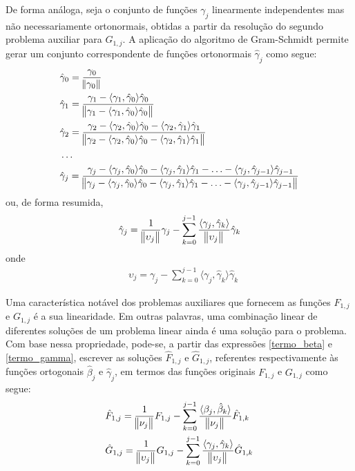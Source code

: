 De forma análoga, seja o conjunto de funções $\gamma_j$ linearmente independentes mas não necessariamente ortonormais, obtidas a partir da resolução do segundo problema auxiliar para $G_{1,j}$. A aplicação do algoritmo de Gram-Schmidt permite gerar um conjunto correspondente de funções ortonormais $\hat{\gamma}_j$ como segue:
\begin{align}
& \hat{\gamma}_0 = \frac{\gamma_0}{\norm{\gamma_0}} \label{gram_schmidt_05} \\
& \hat{\gamma}_1
=
\frac{\gamma_1 - \langle \gamma_1, \hat{\gamma}_0\rangle\hat{\gamma}_0}
{\norm{\gamma_1 - \langle \gamma_1, \hat{\gamma}_0\rangle\hat{\gamma}_0}}\label{gram_schmidt_06} \\
& \hat{\gamma}_2
=
\frac{\gamma_2 - \langle \gamma_2, \hat{\gamma}_0\rangle\hat{\gamma}_0 - \langle \gamma_2, \hat{\gamma}_1\rangle\hat{\gamma}_1}
{\norm{\gamma_2 - \langle \gamma_2, \hat{\gamma}_0\rangle\hat{\gamma}_0 - \langle \gamma_2, \hat{\gamma}_1\rangle\hat{\gamma}_1}} \label{gram_schmidt_07} \\
& \ldots \nonumber \\
& \hat{\gamma}_j
=
\frac{\gamma_j - \langle \gamma_j, \hat{\gamma}_0\rangle\hat{\gamma}_0 - \langle \gamma_j, \hat{\gamma}_1\rangle\hat{\gamma}_1 - \ldots - \langle \gamma_j, \hat{\gamma}_{j - 1}\rangle\hat{\gamma}_{j - 1} }
{\norm{\gamma_j - \langle \gamma_j, \hat{\gamma}_0\rangle\hat{\gamma}_0 - \langle \gamma_j, \hat{\gamma}_1\rangle\hat{\gamma}_1 - \ldots - \langle \gamma_j, \hat{\gamma}_{j - 1}\rangle\hat{\gamma}_{j - 1} }}\label{gram_schmidt_08}
\end{align}
ou, de forma resumida,
\begin{align}
\hat{\gamma}_j = \frac{1}{\norm{\upsilon_j}}\gamma_j - \sum_{k=0}^{j-1} \frac{\langle \gamma_j, \hat{\gamma}_k \rangle}{\norm{\upsilon_j}} \hat{\gamma}_k \label{termo_gamma}
\end{align}
onde
\begin{align}
& \upsilon_j = \gamma_j - \sum_{k = 0}^{j - 1} \langle \gamma_j, \hat{\gamma}_k\rangle\hat{\gamma}_k
\end{align}

Uma característica notável dos problemas auxiliares que fornecem as funções $F_{1,j}$ e $G_{1,j}$ é a sua linearidade. Em outras palavras, uma combinação linear de diferentes soluções de um problema linear ainda é uma solução para o problema. Com base nessa propriedade, pode-se, a partir das expressões \eqref{termo_beta} e \eqref{termo_gamma}, escrever as soluções $\hat{F}_{1,j}$ e $\hat{G}_{1,j}$, referentes respectivamente às funções ortogonais $\hat{\beta}_j$ e $\hat{\gamma}_j$, em termos das funções originais $F_{1,j}$ e $G_{1,j}$ como segue:
\begin{align}
& \hat{F}_{1,j} = \frac{1}{\norm{\nu_j}}F_{1,j} - \sum_{k=0}^{j-1} \frac{\langle \beta_j, \hat{\beta}_k \rangle}{\norm{\nu_j}} \hat{F}_{1,k} \label{termo_gram}
\\ 
& \hat{G}_{1,j} = \frac{1}{\norm{\upsilon_j}}G_{1,j} - \sum_{k=0}^{j-1} \frac{\langle \gamma_j, \hat{\gamma}_k \rangle}{\norm{\upsilon_j}} \hat{G}_{1,k} \label{termo_gram_2}
\end{align}

